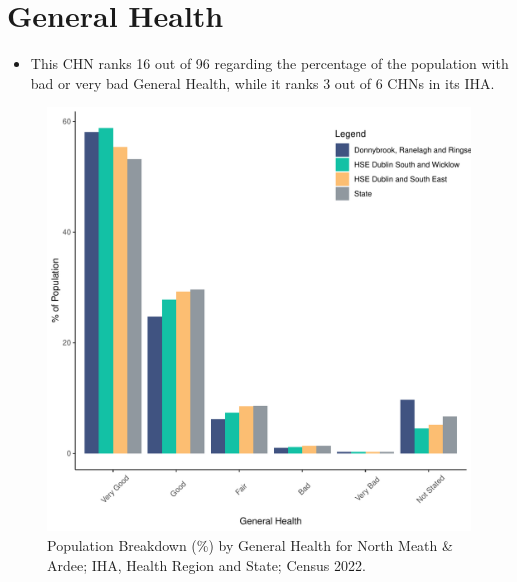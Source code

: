 \documentclass{article}
\begin{document}
\pagebreak

\section{General Health}\label{sect:GenHealth}
\begin{itemize}
\item  This CHN ranks  16 out of 96 regarding the percentage of the population with bad or very bad General Health, while it ranks   3 out of 6 CHNs in its IHA.
\end{itemize}
\begin{figure}[h]
	\centering
	\includegraphics[width = 150mm]{../figures/GenED.pdf}
	\caption{Population Breakdown (\%) by General Health for North Meath & Ardee; IHA, Health Region and State;  Census 2022.}
	\label{fig:2ae19629-1a6a-13a3-e055-000000000001}
	\end{figure}
\end{document}
